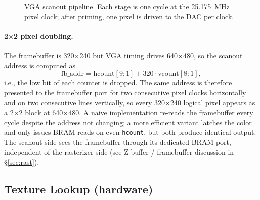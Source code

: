 \documentclass[11pt]{article}
\begin{document}
\begin{figure}[h]
\centering
{}
\caption{VGA scanout pipeline. Each stage is one cycle at the 25.175~MHz pixel clock; after priming, one pixel is driven to the DAC per clock.}
\label{fig:scanout}
\end{figure}

\paragraph{2$\times$2 pixel doubling.} The framebuffer is 320$\times$240 but VGA timing drives 640$\times$480, so the scanout address is computed as
\[
  \text{fb\_addr} = \text{hcount}[9{:}1] + 320 \cdot \text{vcount}[8{:}1],
\]
i.e., the low bit of each counter is dropped. The same address is therefore presented to the framebuffer port for two consecutive pixel clocks horizontally and on two consecutive lines vertically, so every 320$\times$240 logical pixel appears as a 2$\times$2 block at 640$\times$480. A naive implementation re-reads the framebuffer every cycle despite the address not changing; a more efficient variant latches the color and only issues BRAM reads on even \texttt{hcount}, but both produce identical output. The scanout side sees the framebuffer through its dedicated BRAM port, independent of the rasterizer side (see Z-buffer / framebuffer discussion in \S\ref{sec:rast}).

\subsection{Texture Lookup (hardware)}
\end{document}
